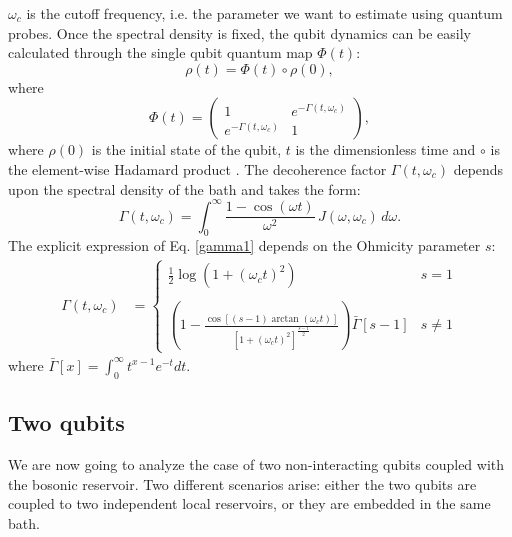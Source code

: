 \documentclass[ pra,a4paper,aps,twocolumn,superscriptaddress]{revtex4-1}
\def\tc#1{{\color{black}#1}}
\begin{document}
 $\omega_{c}$ is the cutoff frequency, i.e. the parameter we want to 
 estimate using quantum probes.
 Once the spectral density is fixed, the qubit dynamics can be easily  
 calculated through the
 single qubit quantum map $\Phi(t)$:
 \begin{equation}
\rho(t)=\Phi(t)\circ\rho(0),
\end{equation}
where
\begin{equation}\Phi(t) =\left( \begin{matrix}
1 & e^{-\Gamma(t,\omega_{c})} \\ e^{-\Gamma(t,\omega_{c})} & 1 \end{matrix}\right),
\label{phi1}
\end{equation}
where $\rho(0)$ is the initial state of the qubit, \tc{$t$ is the dimensionless time } and $\circ$ is  the element-wise Hadamard product  \cite{addis14}. 
The decoherence factor $\Gamma(t,\omega_c)$ depends upon the spectral density of the bath and takes the form:
\begin{equation}
\Gamma(t,\omega_{c})=\int_0^{\infty}  \frac{1-\cos(\omega t)}{\omega^2}\,J(\omega,\omega_c)\, d\omega.
\label{gamma1}
\end{equation}
The explicit expression of Eq. \eqref{gamma1}  depends  on the Ohmicity parameter $s$:
\begin{align}
\Gamma(t,\omega_{\!c} )& \!=\! \left\{\begin{array}{ll}
\frac12 \log\left(1+(\omega_{c} t)^2\right)&s=1\\
\\
\!\!\!\! \left(\! 1-\frac{\cos[(s-1)\arctan(\omega_{c} t)]}{\left[1+(\omega_{c} t)^2\right]^{\frac{s-1}{2}}} \! \right)\! \bar{\Gamma}[s-1]&s\neq1
\end{array}\right.
\label{gamtau}
\end{align}
where   $\bar{\Gamma}[x]=\int_0^\infty t^{x-1}e^{-t } dt$.
\subsection{Two qubits}
We are now going to analyze the case of two non-interacting qubits coupled with the bosonic reservoir. Two different scenarios  arise: either the two qubits are coupled to two independent local reservoirs, or they are embedded in the same bath.
\end{document}
